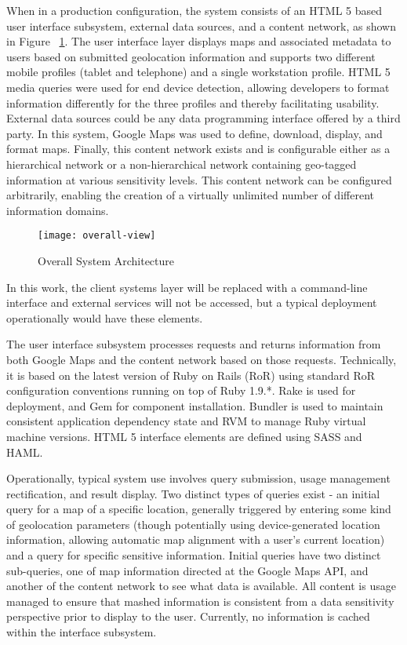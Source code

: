 When in a production configuration, the system consists of an HTML 5 based user interface subsystem, external data sources, and a content network, as shown in Figure ~\ref{fig:model:overall-view}.  The user interface layer displays maps and associated metadata to users based on submitted geolocation information and supports two different mobile profiles (tablet and telephone) and a single workstation profile.  HTML 5 media queries were used for end device detection, allowing developers to format information differently for the three profiles and thereby facilitating usability.  External data sources could be any data programming interface offered by a third party.  In this system, Google Maps was used to define, download, display, and format maps.  Finally, this content network exists and is configurable either as a hierarchical network or a non-hierarchical network containing geo-tagged information at various sensitivity levels.  This content network can be configured arbitrarily, enabling the creation of a virtually unlimited number of different information domains.

\begin{figure}[!t]
\centering
\texttt{[image: overall-view]}
\caption{Overall System Architecture}
\label{fig:model:overall-view}
\end{figure}

In this work, the client systems layer will be replaced with a command-line interface and external services will not be accessed, but a typical deployment operationally would have these elements.

The user interface subsystem processes requests and returns information from both Google Maps and the content network based on those requests.  Technically, it is based on the latest version of Ruby on Rails (RoR) using standard RoR configuration conventions running on top of Ruby 1.9.*.  Rake is used for deployment, and Gem for component installation.  Bundler is used to maintain consistent application dependency state and RVM to manage Ruby virtual machine versions.  HTML 5 interface elements are defined using SASS and HAML.

Operationally, typical system use involves query submission, usage management rectification,  and result display.  Two distinct types of queries exist - an initial query for a map of a specific location, generally triggered by entering some kind of geolocation parameters (though potentially using device-generated location information, allowing automatic map alignment with a user's current location) and a query for specific sensitive information.  Initial queries have two distinct sub-queries, one of map information directed at the Google Maps API, and another of the content network to see what data is available.  All content is usage managed to ensure that mashed information is consistent from a data sensitivity perspective prior to display to the user.  Currently, no information is cached within the interface subsystem.

